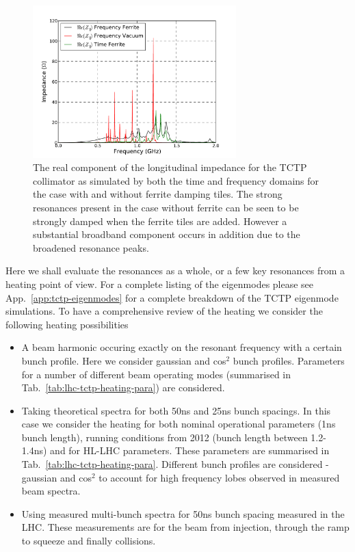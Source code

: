 \begin{figure}
\begin{center}
\includegraphics[width=0.7\textwidth]{LHC_Collimation_Upgrades/figures/longitudinal-impedance-tctp-ferr-freq-dom.pdf}
\end{center}
\label{fig:long-imp-tctp-freq}
\caption{The real component of the longitudinal impedance for the TCTP collimator as simulated by both the time and frequency domains for the case with and without ferrite damping tiles. The strong resonances present in the case without ferrite can be seen to be strongly damped when the ferrite tiles are added. However a substantial broadband component occurs in addition due to the broadened resonance peaks.}
\end{figure}

Here we shall evaluate the resonances as a whole, or a few key resonances from a heating point of view. For a complete listing of the eigenmodes please see App.~\ref{app:tctp-eigenmodes} for a complete breakdown of the TCTP eigenmode simulations. To have a comprehensive review of the heating we consider the following heating possibilities

\begin{itemize}
\item{A beam harmonic occuring exactly on the resonant frequency with a certain bunch profile. Here we consider gaussian and cos$^{2}$ bunch profiles. Parameters for a number of different beam operating modes (summarised in Tab.~\ref{tab:lhc-tctp-heating-para}) are considered.}
\item{Taking theoretical spectra for both 50ns and 25ns bunch spacings. In this case we consider the heating for both nominal operational parameters (1ns bunch length), running conditions from 2012 (bunch length between 1.2-1.4ns) and for HL-LHC parameters. These parameters are summarised in Tab.~\ref{tab:lhc-tctp-heating-para}. Different bunch profiles are considered - gaussian and cos$^{2}$ to account for high frequency lobes observed in measured beam spectra.}
\item{Using measured multi-bunch spectra for 50ns bunch spacing measured in the LHC. These measurements are for the beam from injection, through the ramp to squeeze and finally collisions.}
\end{itemize}

